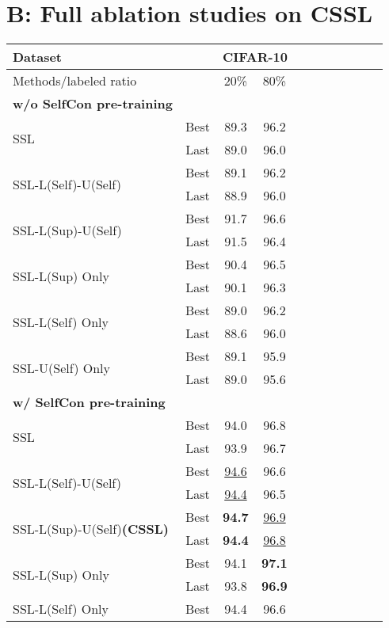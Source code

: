 \documentclass[letterpaper]{article} \usepackage{aaai22}  \usepackage{times}  \usepackage{helvet}  \usepackage{courier}  \usepackage[hyphens]{url}  \usepackage{graphicx} \usepackage{subfigure}
\begin{document}
\section{B: Full ablation studies on CSSL}
\begin{table}[h]
\begin{center}
\begin{tabular}{lcccccccccc}
\hline
Dataset & & \multicolumn{2}{c}{CIFAR-10} \\
\hline
Methods/labeled ratio & & 20\% & 80\%  \\
\hline
\textbf{w/o SelfCon pre-training} \\
\hline
\multirow{2}{*}{SSL} & Best & 89.3 & 96.2 \\
& Last & 89.0 & 96.0 \\
\hline
\multirow{2}{*}{SSL-L(Self)-U(Self)} & Best & 89.1 & 96.2 \\
& Last & 88.9 & 96.0 \\
\hline
\multirow{2}{*}{SSL-L(Sup)-U(Self)} & Best & 91.7 & 96.6 \\
& Last & 91.5 & 96.4 \\
\hline
\hline
\multirow{2}{*}{SSL-L(Sup) Only} & Best & 90.4 & 96.5 \\
& Last & 90.1& 96.3 \\
\hline
\multirow{2}{*}{SSL-L(Self) Only} & Best & 89.0 & 96.2 \\
& Last & 88.6& 96.0 \\
\hline
\multirow{2}{*}{SSL-U(Self) Only} & Best & 89.1& 95.9 \\
& Last & 89.0 & 95.6\\
\hline
\textbf{w/ SelfCon pre-training} \\
\hline
\multirow{2}{*}{SSL} & Best & 94.0 & 96.8 \\
& Last & 93.9 & 96.7 \\
\hline
\multirow{2}{*}{SSL-L(Self)-U(Self)} & Best & \underline{94.6} & 96.6 \\
& Last & \underline{94.4} & 96.5 \\
\hline
\multirow{2}{*}{SSL-L(Sup)-U(Self)\textbf{(CSSL)}} & Best & \textbf{94.7} & \underline{96.9} \\
& Last & \textbf{94.4} & \underline{96.8} \\
\hline
\hline
\multirow{2}{*}{SSL-L(Sup) Only} & Best & 94.1 & \textbf{97.1} \\
& Last & 93.8 & \textbf{96.9} \\
\hline
\multirow{2}{*}{SSL-L(Self) Only} & Best & 94.4 & 96.6 \\

\end{tabular}
\end{center}
\end{table}
\end{document}
